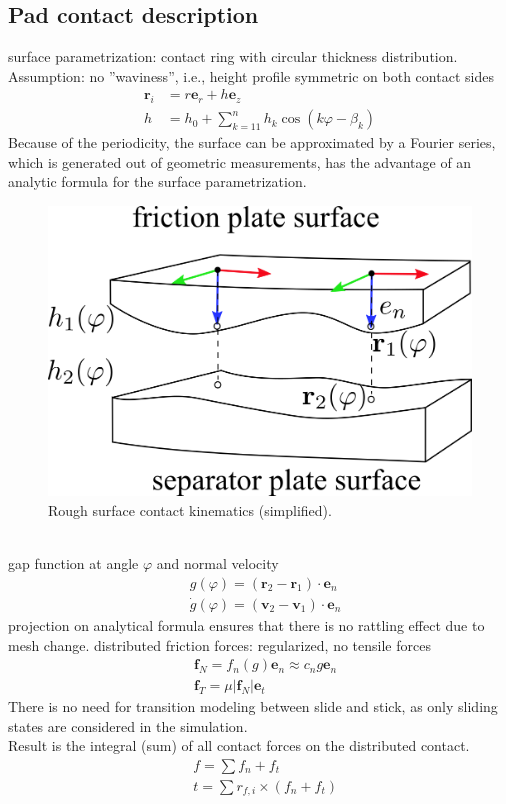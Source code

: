\documentclass[a4paper,fleqn]{cas-dc}
\begin{document}
\subsection{Pad contact description}
surface parametrization: contact ring with circular thickness distribution. Assumption: no ''waviness'', i.e., height profile symmetric on both contact sides
\begin{align}
	\boldsymbol{r}_i & = r\boldsymbol{e}_r + h\boldsymbol{e}_z\\
	h & = h_0 + \sum_{k=11}^{n}h_k \cos\left(k\varphi-\beta_k\right) 
\end{align}
Because of the periodicity, the surface can be approximated by a Fourier series, which is generated out of geometric measurements, has the advantage of an analytic formula for the surface parametrization. 
\begin{figure}
	\centering
	\includegraphics[scale=.75]{figs/roughsurf.png}
	\caption{Rough surface contact kinematics (simplified). }
	\label{fig:roughsurf}
\end{figure}\\
gap function \cite{willner2013kontinuums} at angle $\varphi$ and normal velocity
\begin{align}
	& g(\varphi) = \left(\boldsymbol{r}_2-\boldsymbol{r}_1\right)\cdot \boldsymbol{e}_n\\
	& \dot g(\varphi) = \left(\boldsymbol{v}_2-\boldsymbol{v}_1\right)\cdot \boldsymbol{e}_n	
\end{align}
projection on analytical formula ensures that there is no rattling effect due to mesh change. distributed friction forces: regularized, no tensile forces 
\begin{align}
&\boldsymbol{f}_{N} = f_n(g) \boldsymbol{e}_n\approx c_n g\boldsymbol{e}_n\\
&\boldsymbol{f}_{T} = \mu |\boldsymbol f_N| \boldsymbol{e}_t
\end{align}
There is no need for transition modeling between slide and stick, as only sliding states are considered in the simulation. \\
Result is the integral (sum) of all contact forces on the distributed contact. 
\begin{align}
& f = \sum f_n + f_t\\
& t = \sum r_{f,i}\times \left(f_n + f_t\right)
\end{align}
\end{document}
